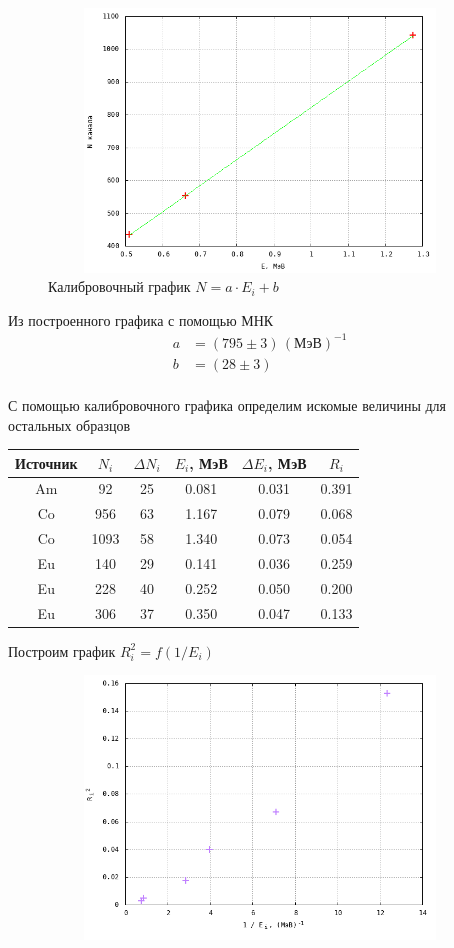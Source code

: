 \documentclass[12pt]{article}
\begin{document}
\begin{figure}[h!]
	\centering
	\includegraphics[width = 13cm, height = 7cm]{plot1.png}
	\caption{Калибровочный график $N = a \cdot E_i + b$}
\end{figure}
\par
	Из построенного графика с помощью МНК
\begin{align*}
	a &= \left(795 \pm 3 \right) \, (\text{МэВ})^{-1} \\
	b & = \left(28 \pm 3 \right) \\
\end{align*}
\newpage
\par
	С помощью калибровочного графика определим искомые величины для остальных образцов
\begin{table}[h!]
	\centering
	\begin{tabular}{|c|c|c|c|c|c|}
	\hline
		Источник & $N_i$ & $\Delta N_i$ & $E_i$, МэВ & $\Delta E_i$, МэВ & $R_i$\\
	\hline
	Am	&92	&25&	0.081&	0.031&	0.391 \\
	\hline	
	Co	&956&	63&	1.167&	0.079&	0.068 \\
	\hline	
	Co	&1093&	58&	1.340&	0.073&	0.054 \\
	\hline	
	Eu	&140	&29&	0.141&	0.036&	0.259 \\
	\hline	
	Eu	&228	&40&	0.252&	0.050&	0.200 \\
	\hline	
	Eu	&306	&37&	0.350&	0.047&	0.133 \\
	\hline
	\end{tabular}
\end{table}
\par
	Построим график $R_i^2 = f(1 / E_i)$
\begin{figure}[h!]
	\centering
	\includegraphics[width = 13cm, height = 7cm]{plot2.png}
\end{figure}
\end{document}
